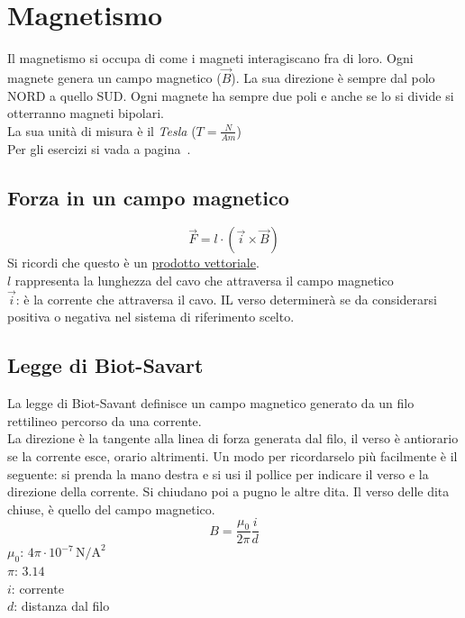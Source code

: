 
\section{Magnetismo}\label{sec:magnetismo}
Il magnetismo si occupa di come i magneti interagiscano fra di loro. Ogni magnete genera un
campo magnetico ($\vec{B}$). La sua direzione è sempre dal polo NORD a quello SUD. Ogni magnete ha
sempre due poli e anche se lo si divide si otterranno magneti bipolari.\\ 
La sua unità di misura è il \emph{Tesla} ($T = \frac{N}{Am}$)\\
Per gli esercizi si vada a pagina~\pageref{ex:magnetismo}.

\subsection{Forza in un campo magnetico}
\begin{equation*}	
\vec{F} = l\cdot(\vec{i}\times\vec{B})
\end{equation*}
Si ricordi che questo è un \hyperref[subsec:vettori:prodottoVettoriale]{prodotto vettoriale}.\\
$l$ rappresenta la lunghezza del cavo che attraversa il campo magnetico\\
$\vec{i}$: è la corrente che attraversa il cavo. IL verso determinerà se da considerarsi positiva o
negativa nel sistema di riferimento scelto.

\subsection{Legge di Biot-Savart}
La legge di Biot-Savant definisce un campo magnetico generato da un filo rettilineo percorso da
una corrente.\\
La direzione è la tangente alla linea di forza generata dal filo, il verso è antiorario se la
corrente esce, orario altrimenti. Un modo per ricordarselo più facilmente è il seguente: si prenda la
mano destra e si usi il pollice per indicare il verso e la direzione della corrente. Si chiudano poi
a pugno le altre dita. Il verso delle dita chiuse, è quello del campo magnetico.
\begin{equation*}
B = \frac{\mu_0}{2\pi}\frac{i}{d}
\end{equation*}
\hyperref[tab:mu0]{$\mu_0$}: $4\pi\cdot10^{-7}\,\text{N/A}^2$\\
\hyperref[tab:pi]{$\pi$}: $3.14$\\
$i$: corrente\\
$d$: distanza dal filo\\ [\baselineskip]

